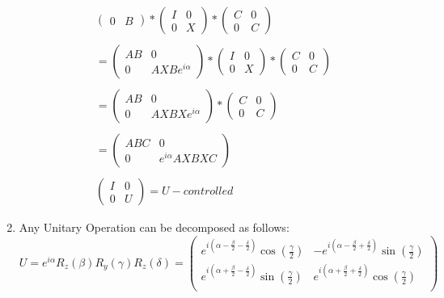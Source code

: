 \documentclass[a4paper,12pt]{article}
\begin{document}
\begin{enumerate}[label=(\alph*)]
\begin{gather*}
\begin{pmatrix}
0 & B
\end{pmatrix} *\begin{pmatrix}
I & 0 \\
0 & X
\end{pmatrix} *\begin{pmatrix}
C & 0 \\
0 & C
\end{pmatrix}\\~\\
=
\begin{pmatrix}
AB & 0 \\
0 & AXBe^{i\alpha}
\end{pmatrix} *\begin{pmatrix}
I & 0 \\
0 & X
\end{pmatrix} *\begin{pmatrix}
C & 0 \\
0 & C
\end{pmatrix}\\~\\
=\begin{pmatrix}
AB & 0 \\
0 & AXBXe^{i\alpha}
\end{pmatrix} * \begin{pmatrix}
C & 0 \\
0 & C
\end{pmatrix}\\~\\
= \begin{pmatrix}
ABC & 0 \\
0 & e^{i\alpha}AXBXC
\end{pmatrix}
\\~\\
\begin{pmatrix}
I & 0 \\
0 & U
\end{pmatrix} = U-controlled
\end{gather*}
\item Any Unitary Operation can be decomposed as follows: \\
\[U = e^{i\alpha}R_{z}(\beta)R_{y}(\gamma)R_{z}(\delta) = \begin{pmatrix}
    e^{i(\alpha - \frac{\beta}{2}-\frac{\delta}{2})}\cos(\frac{\gamma}{2}) & -e^{i(\alpha - \frac{\beta}{2}+\frac{\delta}{2})}\sin(\frac{\gamma}{2}) \\
    e^{i(\alpha + \frac{\beta}{2}-\frac{\delta}{2})}\sin(\frac{\gamma}{2}) & e^{i(\alpha + \frac{\beta}{2}+\frac{\delta}{2})}\cos(\frac{\gamma}{2}) \\

\end{pmatrix}\]
\end{enumerate}
\end{document}
